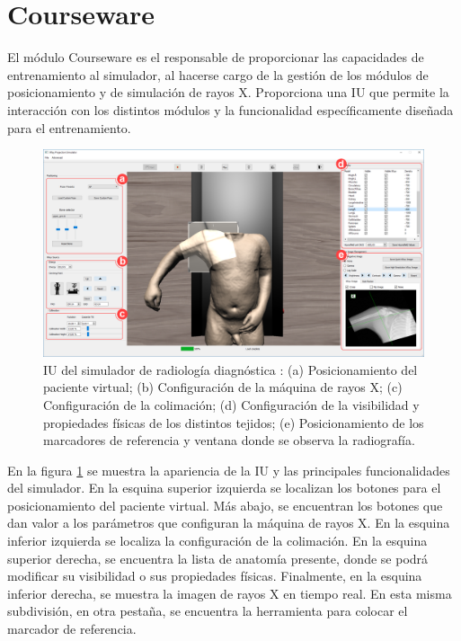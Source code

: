 



\section{Courseware}
\label{xray:courseware}

El módulo \ac{Courseware} es el responsable de proporcionar las capacidades de entrenamiento al simulador, al hacerse cargo de la gestión de los módulos de posicionamiento y de simulación de rayos X. Proporciona una \ac{IU} que permite la interacción con los distintos módulos y la funcionalidad específicamente diseñada para el entrenamiento.
\begin{figure}
    \centering
    \includegraphics[width=\linewidth]{IMG/uiteacher.png}
    \caption{\acs{IU} del simulador de radiología diagnóstica : (a) Posicionamiento del paciente virtual;  (b) Configuración de la máquina de rayos X; (c) Configuración de la colimación; (d) Configuración de la visibilidad y propiedades físicas de los distintos tejidos; (e) Posicionamiento de los marcadores de referencia y ventana donde se observa la radiografía.}
    \label{fig:uiusecase}
\end{figure}

En la figura \ref{fig:uiusecase} se muestra la apariencia de la \ac{IU} y las principales funcionalidades del simulador. En la esquina superior izquierda se localizan los botones para el posicionamiento del paciente virtual. Más abajo, se encuentran los botones que dan valor a los parámetros que configuran la máquina de rayos X. En la esquina inferior izquierda se localiza la configuración de la colimación. En la esquina superior derecha, se encuentra la lista de anatomía presente, donde se podrá modificar su visibilidad o sus propiedades físicas.  Finalmente, en la esquina inferior derecha, se muestra la imagen de rayos X en tiempo real. En esta misma subdivisión, en otra pestaña, se encuentra la herramienta para colocar el marcador de referencia.

